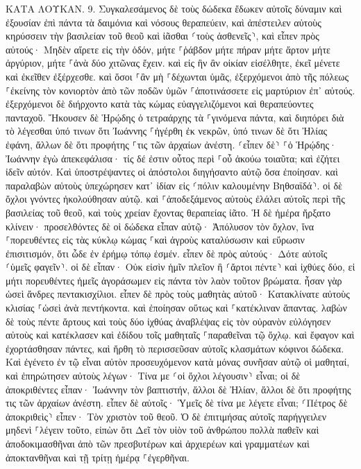 \documentclass[twoside, 9pt]{extreport}
\begin{document}
ΚΑΤΑ ΛΟΥΚΑΝ.
9.
Συγκαλεσάμενος δὲ τοὺς δώδεκα ἔδωκεν αὐτοῖς δύναμιν καὶ ἐξουσίαν ἐπὶ πάντα τὰ δαιμόνια καὶ νόσους θεραπεύειν, 
καὶ ἀπέστειλεν αὐτοὺς κηρύσσειν τὴν βασιλείαν τοῦ θεοῦ καὶ ἰᾶσθαι ⸂τοὺς ἀσθενεῖς⸃, 
καὶ εἶπεν πρὸς αὐτούς· Μηδὲν αἴρετε εἰς τὴν ὁδόν, μήτε ⸀ῥάβδον μήτε πήραν μήτε ἄρτον μήτε ἀργύριον, μήτε ⸀ἀνὰ δύο χιτῶνας ἔχειν. 
καὶ εἰς ἣν ἂν οἰκίαν εἰσέλθητε, ἐκεῖ μένετε καὶ ἐκεῖθεν ἐξέρχεσθε. 
καὶ ὅσοι ⸀ἂν μὴ ⸀δέχωνται ὑμᾶς, ἐξερχόμενοι ἀπὸ τῆς πόλεως ⸀ἐκείνης τὸν κονιορτὸν ἀπὸ τῶν ποδῶν ὑμῶν ⸀ἀποτινάσσετε εἰς μαρτύριον ἐπ᾽ αὐτούς. 
ἐξερχόμενοι δὲ διήρχοντο κατὰ τὰς κώμας εὐαγγελιζόμενοι καὶ θεραπεύοντες πανταχοῦ. 
Ἤκουσεν δὲ Ἡρῴδης ὁ τετραάρχης τὰ ⸀γινόμενα πάντα, καὶ διηπόρει διὰ τὸ λέγεσθαι ὑπό τινων ὅτι Ἰωάννης ⸀ἠγέρθη ἐκ νεκρῶν, 
ὑπό τινων δὲ ὅτι Ἠλίας ἐφάνη, ἄλλων δὲ ὅτι προφήτης ⸀τις τῶν ἀρχαίων ἀνέστη. 
⸂εἶπεν δὲ⸃ ⸀ὁ Ἡρῴδης· Ἰωάννην ἐγὼ ἀπεκεφάλισα· τίς δέ ἐστιν οὗτος περὶ ⸀οὗ ἀκούω τοιαῦτα; καὶ ἐζήτει ἰδεῖν αὐτόν. 
Καὶ ὑποστρέψαντες οἱ ἀπόστολοι διηγήσαντο αὐτῷ ὅσα ἐποίησαν. καὶ παραλαβὼν αὐτοὺς ὑπεχώρησεν κατ᾽ ἰδίαν εἰς ⸂πόλιν καλουμένην Βηθσαϊδά⸃. 
οἱ δὲ ὄχλοι γνόντες ἠκολούθησαν αὐτῷ. καὶ ⸀ἀποδεξάμενος αὐτοὺς ἐλάλει αὐτοῖς περὶ τῆς βασιλείας τοῦ θεοῦ, καὶ τοὺς χρείαν ἔχοντας θεραπείας ἰᾶτο. 
Ἡ δὲ ἡμέρα ἤρξατο κλίνειν· προσελθόντες δὲ οἱ δώδεκα εἶπαν αὐτῷ· Ἀπόλυσον τὸν ὄχλον, ἵνα ⸀πορευθέντες εἰς τὰς κύκλῳ κώμας ⸀καὶ ἀγροὺς καταλύσωσιν καὶ εὕρωσιν ἐπισιτισμόν, ὅτι ὧδε ἐν ἐρήμῳ τόπῳ ἐσμέν. 
εἶπεν δὲ πρὸς αὐτούς· Δότε αὐτοῖς ⸂ὑμεῖς φαγεῖν⸃. οἱ δὲ εἶπαν· Οὐκ εἰσὶν ἡμῖν πλεῖον ἢ ⸂ἄρτοι πέντε⸃ καὶ ἰχθύες δύο, εἰ μήτι πορευθέντες ἡμεῖς ἀγοράσωμεν εἰς πάντα τὸν λαὸν τοῦτον βρώματα. 
ἦσαν γὰρ ὡσεὶ ἄνδρες πεντακισχίλιοι. εἶπεν δὲ πρὸς τοὺς μαθητὰς αὐτοῦ· Κατακλίνατε αὐτοὺς κλισίας ⸀ὡσεὶ ἀνὰ πεντήκοντα. 
καὶ ἐποίησαν οὕτως καὶ ⸀κατέκλιναν ἅπαντας. 
λαβὼν δὲ τοὺς πέντε ἄρτους καὶ τοὺς δύο ἰχθύας ἀναβλέψας εἰς τὸν οὐρανὸν εὐλόγησεν αὐτοὺς καὶ κατέκλασεν καὶ ἐδίδου τοῖς μαθηταῖς ⸀παραθεῖναι τῷ ὄχλῳ. 
καὶ ἔφαγον καὶ ἐχορτάσθησαν πάντες, καὶ ἤρθη τὸ περισσεῦσαν αὐτοῖς κλασμάτων κόφινοι δώδεκα. 
Καὶ ἐγένετο ἐν τῷ εἶναι αὐτὸν προσευχόμενον κατὰ μόνας συνῆσαν αὐτῷ οἱ μαθηταί, καὶ ἐπηρώτησεν αὐτοὺς λέγων· Τίνα με ⸂οἱ ὄχλοι λέγουσιν⸃ εἶναι; 
οἱ δὲ ἀποκριθέντες εἶπαν· Ἰωάννην τὸν βαπτιστήν, ἄλλοι δὲ Ἠλίαν, ἄλλοι δὲ ὅτι προφήτης τις τῶν ἀρχαίων ἀνέστη. 
εἶπεν δὲ αὐτοῖς· Ὑμεῖς δὲ τίνα με λέγετε εἶναι; ⸂Πέτρος δὲ ἀποκριθεὶς⸃ εἶπεν· Τὸν χριστὸν τοῦ θεοῦ. 
Ὁ δὲ ἐπιτιμήσας αὐτοῖς παρήγγειλεν μηδενὶ ⸀λέγειν τοῦτο, 
εἰπὼν ὅτι Δεῖ τὸν υἱὸν τοῦ ἀνθρώπου πολλὰ παθεῖν καὶ ἀποδοκιμασθῆναι ἀπὸ τῶν πρεσβυτέρων καὶ ἀρχιερέων καὶ γραμματέων καὶ ἀποκτανθῆναι καὶ τῇ τρίτῃ ἡμέρᾳ ⸀ἐγερθῆναι. 
\end{document}
